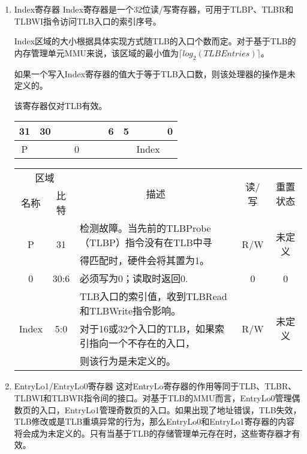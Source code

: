 \begin{enumerate}[(1)]
\item Index寄存器
Index寄存器是一个32位读/写寄存器，可用于TLBP、TLBR和TLBWI指令访问TLB入口的索引序号。

Index区域的大小根据具体实现方式随TLB的入口个数而定。对于基于TLB的内存管理单元MMU来说，该区域的最小值为$\lceil log_{2}(TLBEntries)\rceil$。

如果一个写入Index寄存器的值大于等于TLB入口数，则该处理器的操作是未定义的。

该寄存器仅对TLB有效。

\begin{table}[H]
\centering
\begin{tabular}{ccccccccccccc}
31&30&&&&&&6&5&&&&0\\
\hline
\multicolumn{1}{|c|}{P}&
\multicolumn{7}{c|}{0}&
\multicolumn{5}{c|}{Index}\\
\hline
\end{tabular}
\end{table}

\begin{table}[H]
\centering
\begin{tabular}{|c|c|c|c|c|}
\hline
\multicolumn{2}{|c|}{区域}&
\multirow{2}{*}{描述}&
\multirow{2}{*}{读/写}&
\multirow{2}{*}{重置状态}\\
\cline{1-2}
名称&比特&&&\\
\hline
\multirow{2}{*}{P}&
\multirow{2}{*}{31}&
\multicolumn{1}{l|}{检测故障。当先前的TLBProbe（TLBP）指令没有在TLB中寻}&
\multirow{2}{*}{R/W}&
\multirow{2}{*}{未定义}\\
&&
\multicolumn{1}{l|}{得匹配时，硬件会将其置为1。}&
&\\
\hline
0&30:6&
\multicolumn{1}{l|}{必须写为0；读取时返回0.}&
0&0\\
\hline
\multirow{3}{*}{Index}&
\multirow{3}{*}{5:0}&
\multicolumn{1}{l|}{TLB入口的索引值，收到TLBRead和TLBWrite指令影响。}&
\multirow{3}{*}{R/W}&
\multirow{3}{*}{未定义}\\
&&
\multicolumn{1}{l|}{对于16或32个入口的TLB，如果索引指向一个不存在的入口，}&
&\\
&&
\multicolumn{1}{l|}{则该行为是未定义的。}&
&\\
\hline
\end{tabular}
\end{table}

\item EntryLo1/EntryLo0寄存器
这对EntryLo寄存器的作用等同于TLB、TLBR、TLBWI和TLBWR指令间的接口。对基于TLB的MMU而言，EntryLo0管理偶数页的入口，EntryLo1管理奇数页的入口。如果出现了地址错误，TLB失效，TLB修改或是TLB重填异常的行为，那么EntryLo0和EntryLo1寄存器的内容将会成为未定义的。只有当基于TLB的存储管理单元存在时，这些寄存器才有效。


\end{enumerate}
